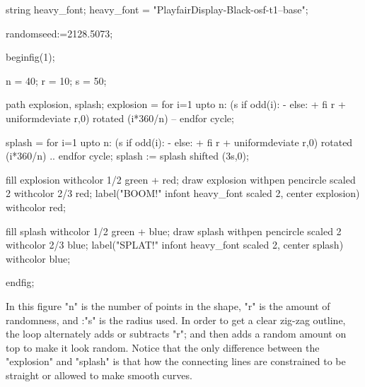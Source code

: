\documentclass[a4paper,landscape]{article}
\begin{document}
\begin{code}
string heavy_font; 
heavy_font = "PlayfairDisplay-Black-osf-t1--base";

randomseed:=2128.5073;

beginfig(1);

n = 40; r = 10; s = 50;

path explosion, splash;
explosion = for i=1 upto n:
  (s if odd(i): - else: + fi r + uniformdeviate r,0) rotated (i*360/n) --
endfor cycle; 

splash = for i=1 upto n:
  (s if odd(i): - else: + fi r + uniformdeviate r,0) rotated (i*360/n) ..
endfor cycle; 
splash := splash shifted (3s,0);

fill explosion withcolor 1/2 green + red;
draw explosion withpen pencircle scaled 2 withcolor 2/3 red;
label("BOOM!" infont heavy_font scaled 2, center explosion) withcolor red;

fill splash withcolor 1/2 green + blue;
draw splash withpen pencircle scaled 2 withcolor 2/3 blue;
label("SPLAT!" infont heavy_font scaled 2, center splash) withcolor blue;

endfig;
\end{code}

\noindent
In this figure "n" is the number of points in the shape, "r" is the amount of
randomness, and :"s" is the radius used.
In order to get a clear zig-zag outline, the loop alternately adds or subtracts "r";
and then adds a random amount on top to make it look random.
Notice that the only difference between the "explosion" and "splash" is that how
the connecting lines are constrained to be straight or allowed to make smooth
curves.
\end{document}
